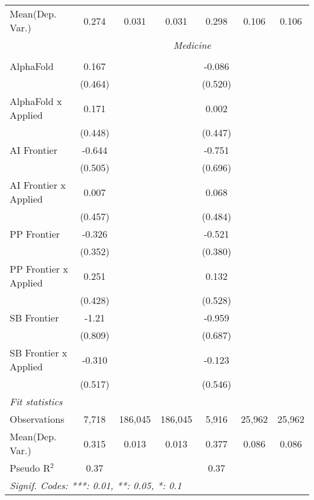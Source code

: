 \begin{tabular}{lcccccc}
Mean(Dep. Var.) & 0.274 & 0.031 & 0.031 & 0.298 & 0.106 & 0.106 \\
 & \multicolumn{6}{c}{\textit{Medicine}} \\ \\
   AlphaFold             & 0.167    &         &         & -0.086  &        &   \\   
                         & (0.464)  &         &         & (0.520) &        &   \\   
   AlphaFold x Applied   & 0.171    &         &         & 0.002   &        &   \\   
                         & (0.448)  &         &         & (0.447) &        &   \\   
   AI Frontier           & -0.644   &         &         & -0.751  &        &   \\   
                         & (0.505)  &         &         & (0.696) &        &   \\   
   AI Frontier x Applied & 0.007    &         &         & 0.068   &        &   \\   
                         & (0.457)  &         &         & (0.484) &        &   \\   
   PP Frontier           & -0.326   &         &         & -0.521  &        &   \\   
                         & (0.352)  &         &         & (0.380) &        &   \\   
   PP Frontier x Applied & 0.251    &         &         & 0.132   &        &   \\   
                         & (0.428)  &         &         & (0.528) &        &   \\   
   SB Frontier           & -1.21    &         &         & -0.959  &        &   \\   
                         & (0.809)  &         &         & (0.687) &        &   \\   
   SB Frontier x Applied & -0.310   &         &         & -0.123  &        &   \\   
                         & (0.517)  &         &         & (0.546) &        &   \\   
   \midrule
   \emph{Fit statistics}\\
   Observations          & 7,718    & 186,045 & 186,045 & 5,916   & 25,962 & 25,962\\  
Mean(Dep. Var.) & 0.315 & 0.013 & 0.013 & 0.377 & 0.086 & 0.086 \\
   Pseudo R$^2$          & 0.37     &         &         & 0.37    &        & \\  
   \midrule \midrule
   \multicolumn{7}{l}{\emph{Signif. Codes: ***: 0.01, **: 0.05, *: 0.1}}\\
\end{tabular}
\par\endgroup
